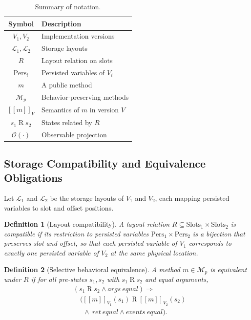 \documentclass[journal]{IEEEtran}
\newtheorem{definition}{Definition}
\newcommand{\llbracket}{[\![}
\newcommand{\rrbracket}{]\!]}
\begin{document}
\begin{table}[t]
\caption{Summary of notation.}
\label{tab:notation}
\centering
\begin{tabular}{cl}
\toprule
Symbol & Description \\
\midrule
$V_1,V_2$ & Implementation versions \\
$\mathcal{L}_1,\mathcal{L}_2$ & Storage layouts \\
$R$ & Layout relation on slots \\
$\mathrm{Pers}_i$ & Persisted variables of $V_i$ \\
$m$ & A public method \\
$\mathcal{M}_p$ & Behavior-preserving methods \\
$\llbracket m \rrbracket_{V}$ & Semantics of $m$ in version $V$ \\
$s_1 \mathbin{R} s_2$ & States related by $R$ \\
$\mathcal{O}(\cdot)$ & Observable projection \\
\bottomrule
\end{tabular}
\end{table}

\subsection{Storage Compatibility and Equivalence Obligations}
Let $\mathcal{L}_1$ and $\mathcal{L}_2$ be the storage layouts of $V_1$ and $V_2$, each mapping persisted variables to slot and offset positions.

\begin{definition}[Layout compatibility]
\label{def:layout}
A layout relation $R \subseteq \mathrm{Slots}_1 \times \mathrm{Slots}_2$ is compatible if its restriction to persisted variables $\mathrm{Pers}_1 \times \mathrm{Pers}_2$ is a bijection that preserves slot and offset, so that each persisted variable of $V_1$ corresponds to exactly one persisted variable of $V_2$ at the same physical location.
\end{definition}

\begin{definition}[Selective behavioral equivalence]
\label{def:equiv}
A method $m \in \mathcal{M}_p$ is equivalent under $R$ if for all pre-states $s_1, s_2$ with $s_1 \mathbin{R} s_2$ and equal arguments,
\begin{equation}
\label{eq:equiv}
\begin{aligned}
&\left( s_1 \mathbin{R} s_2 \wedge \mathit{args\ equal} \right) \Rightarrow \\
&\quad \big( \llbracket m \rrbracket_{V_1}(s_1) \mathbin{R} \llbracket m \rrbracket_{V_2}(s_2) \\
&\quad\ \ \wedge\ \mathit{ret\ equal} \wedge \mathit{events\ equal} \big).
\end{aligned}
\end{equation}
\end{definition}
\end{document}
